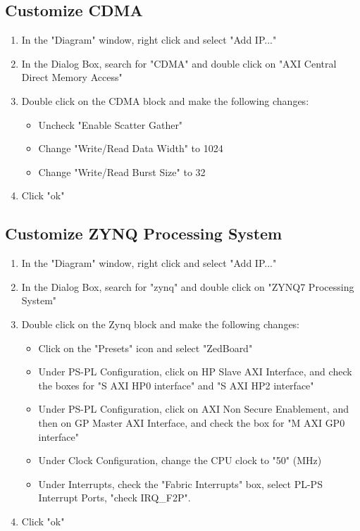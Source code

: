 \documentclass[12pt]{article}
\begin{document}
\subsection{Customize CDMA}
\begin{enumerate}
\item In the "Diagram" window, right click and select "Add IP..."
\item In the Dialog Box, search for "CDMA" and double click on "AXI Central Direct Memory Access"
\item Double click on the CDMA block and make the following changes:
\begin{itemize} 
\item Uncheck "Enable Scatter Gather"
\item Change "Write/Read Data Width" to 1024
\item Change "Write/Read Burst Size" to 32
\end{itemize}
\item Click "ok"
\end{enumerate}

\subsection{Customize ZYNQ Processing System}
\begin{enumerate}
\item In the "Diagram" window, right click and select "Add IP..."
\item In the Dialog Box, search for "zynq" and double click on "ZYNQ7 Processing System"
\item Double click on the Zynq block and make the following changes:
\begin{itemize} 
\item Click on the "Presets" icon and select "ZedBoard"
\item Under PS-PL Configuration, click on HP Slave AXI Interface, and check the boxes for "S AXI HP0 interface" and "S AXI HP2 interface"
\item Under PS-PL Configuration, click on AXI Non Secure Enablement, and then on GP Master AXI Interface, and check the box for "M AXI GP0 interface"
\item Under Clock Configuration, change the CPU clock to "50" (MHz)
\item Under Interrupts, check the "Fabric Interrupts" box, select PL-PS Interrupt Ports, "check IRQ\_F2P".
\end{itemize}
\item Click "ok"
\end{enumerate}
\end{document}
